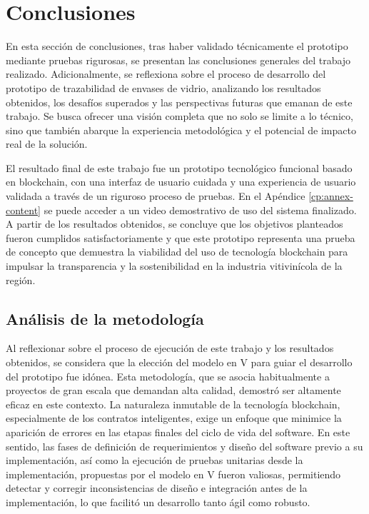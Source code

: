 \chapter[Conclusiones]{Conclusiones}
\label{cp:conclusions}

\parindent0pt

En esta sección de conclusiones, tras haber validado técnicamente el prototipo mediante pruebas rigurosas, se presentan las conclusiones generales del trabajo realizado. Adicionalmente, se reflexiona sobre el proceso de desarrollo del prototipo de trazabilidad de envases de vidrio, analizando los resultados obtenidos, los desafíos superados y las perspectivas futuras que emanan de este trabajo. Se busca ofrecer una visión completa que no solo se limite a lo técnico, sino que también abarque la experiencia metodológica y el potencial de impacto real de la solución.

El resultado final de este trabajo fue un prototipo tecnológico funcional basado en blockchain, con una interfaz de usuario cuidada y una experiencia de usuario validada a través de un riguroso proceso de pruebas. En el Apéndice \ref{cp:annex-content} se puede acceder a un video demostrativo de uso del sistema finalizado. A partir de los resultados obtenidos, se concluye que los objetivos planteados fueron cumplidos satisfactoriamente y que este prototipo representa una prueba de concepto que demuestra la viabilidad del uso de tecnología blockchain para impulsar la transparencia y la sostenibilidad en la industria vitivinícola de la región.

\section{Análisis de la metodología}

Al reflexionar sobre el proceso de ejecución de este trabajo y los resultados obtenidos, se considera que la elección del modelo en V para guiar el desarrollo del prototipo fue idónea. Esta metodología, que se asocia habitualmente a proyectos de gran escala que demandan alta calidad, demostró ser altamente eficaz en este contexto. La naturaleza inmutable de la tecnología blockchain, especialmente de los contratos inteligentes, exige un enfoque que minimice la aparición de errores en las etapas finales del ciclo de vida del software. En este sentido, las fases de definición de requerimientos y diseño del software previo a su implementación, así como la ejecución de pruebas unitarias desde la implementación, propuestas por el modelo en V fueron valiosas, permitiendo detectar y corregir inconsistencias de diseño e integración antes de la implementación, lo que facilitó un desarrollo tanto ágil como robusto.

